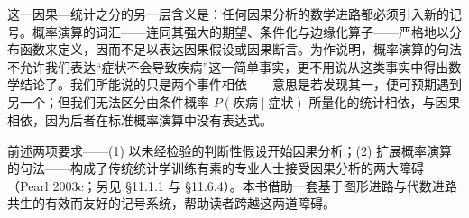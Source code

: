 这一因果—统计之分的另一层含义是：任何因果分析的数学进路都必须引入新的记号。概率演算的词汇——连同其强大的期望、条件化与边缘化算子——严格地以分布函数来定义，因而不足以表达因果假设或因果断言。为作说明，概率演算的句法不允许我们表达“症状不会导致疾病”这一简单事实，更不用说从这类事实中得出数学结论了。我们所能说的只是两个事件相依——意思是若发现其一，便可预期遇到另一个；但我们无法区分由条件概率 $P(\text{疾病}\mid\text{症状})$ 所量化的统计相依，与因果相依，因为后者在标准概率演算中没有表达式。

前述两项要求——(1) 以未经检验的判断性假设开始因果分析；(2) 扩展概率演算的句法——构成了传统统计学训练有素的专业人士接受因果分析的两大障碍（Pearl 2003c；另见 \S 11.1.1 与 \S 11.6.4）。本书借助一套基于图形进路与代数进路共生的有效而友好的记号系统，帮助读者跨越这两道障碍。
